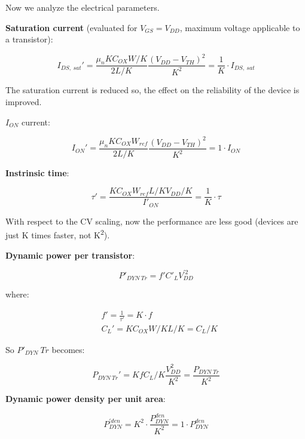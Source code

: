 \documentclass[a4paper, 12pt, twoside, openright]{report}
\newcommand{\super}{\textsuperscript}
\begin{document}
Now we analyze the electrical parameters.

\textbf{Saturation current} (evaluated for $V_{GS} = V_{DD}$, maximum voltage applicable to a transistor):

	\begin{equation}
	I_{DS,\ sat}' = \frac{\mu_n K C_{OX} W/K}{2 L/K}\frac{(V_{DD} - V_{TH})^2}{K^2} = \frac{1}{K} \cdot I_{DS,\ sat}
	\label{}
	\end{equation}

The saturation current is reduced so, the effect on the reliability of the device is improved.

$I_{ON}$ current:

	\begin{equation}
	I_{ON}' = \frac{\mu_n K C_{OX} W_{ref}}{2 L/K}\frac{(V_{DD} - V_{TH})^2}{K^2} = 1 \cdot I_{ON}
	\end{equation}

\textbf{Instrinsic time}:

	\begin{equation}
	\tau ' = \frac{K C_{OX} W_{ref} L/K V_{DD}/K}{I'_{ON}} = \frac{1}{K} \cdot \tau
	\end{equation}

With respect to the CV scaling, now the performance are less good (devices are just K times faster, not K\super{2}).

\textbf{Dynamic power per transistor}:

	\begin{equation}
	P'_{DYN \ Tr} =f' C'_L V_{DD}^{'2}
	\end{equation}

where:

	\begin{align}
	&f' = \frac{1}{\tau'} = K \cdot f \\
	&C_L ' = K C_{OX} W/K L/K = C_L/K
	\end{align}

So $P'_{DYN} \ Tr$ becomes:

	\begin{equation}
	P_{DYN \ Tr}' =  K f C_L/K \frac{V_{DD}^2}{K^2} = \frac{P_{DYN \ Tr}}{K^2}
	\end{equation}

\textbf{Dynamic power density per unit area}:

	\begin{equation}
	P^{'den}_{DYN} = K^2 \cdot \frac{P^{den}_{DYN}}{K^2} = 1 \cdot P^{den}_{DYN}
	\end{equation}
\end{document}
